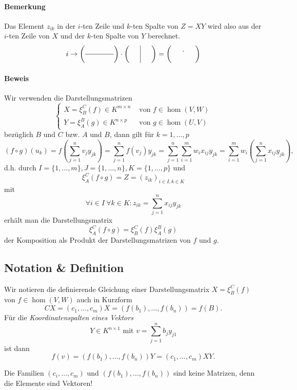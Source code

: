 \paragraph{Bemerkung}
	Das Element $ z_{ik} $ in der $ i $-ten Zeile und $ k $-ten Spalte von $ Z = XY $ wird also aus der $ i $-ten Zeile von $ X $ und der $k$-ten Spalte von $ Y $ berechnet.
	\begin{align*}
	    i\rightarrow
            \left(\begin{array}{cccc}
                &&&\\ 
                \hline
                &&&\\
            \end{array}\right)
            \cdot
            \left(\begin{array}{ccc}
                &\vline &\\
                &\vline &\\
            \end{array}\right)
            =
             \left(\begin{array}{ccc}
                & .&\\
                & &\\
            \end{array}\right)
	\end{align*}
\paragraph{Beweis}
	Wir verwenden die Darstellungsmatrizen
		\[ \begin{cases}
		X = \xi^C_B(f)\in K^{m\times n} &\text{ von } f\in \hom(V,W)\\
		Y = \xi_A^B(g)\in K^{n\times p} &\text{ von } g\in \hom(U,V)
		\end{cases} \]
	bezüglich $ B $ und $ C $ bzw. $ A $ und $ B $, dann gilt für $ k=1,\dots,p $
		\[ (f\circ g)(u_k)=f(\sum_{j=1}^{n}v_jy_{jk}) = \sum_{j=1}^{n}f(v_j)y_{jk} = \sum_{j=1}^{n}\sum_{i=1}^{m}w_ix_{ij}y_{jk} = \sum_{i=1}^{m}w_i\left(\sum_{j=1}^{n}x_{ij}y_{jk}\right), \]
	d.h. durch $ I=\{1,\dots,m\},J=\{1,\dots,n\},K=\{1,\dots,p\} $ und 
		\[ \xi_A^C(f\circ g) = Z = (z_{ik})_{i\in I,k\in K} \]
        mit
                \[ \forall i\in I\ \forall k\in K: z_{ik}= \sum_{j=1}^{n}x_{ij}y_{jk} \]
	erhält man die Darstellungsmatrix
		\[ \xi_A^C(f\circ g) = \xi_B^C(f)\xi_A^B(g) \]
	der Komposition als Produkt der Darstellungsmatrizen von $ f $ und $ g $.
\subsection{Notation \& Definition}
	\begin{Definition}
	Wir notieren die definierende Gleichung einer Darstellungsmatrix $ X=\xi_B^C(f) $ von $ f\in \hom(V,W) $ auch in Kurzform
		\[ CX=(c_1,\dots,c_m)X = (f(b_1),\dots,f(b_n)) = f(B). \]
	Für die \emph{Koordinatenspalten eines Vektors}
		\[ Y\in K^{n\times 1} \text{ mit } v=\sum_{j=1}^{n}b_jy_{j1} \]
	ist dann
		\[ f(v) = (f(b_1),\dots,f(b_n))Y = (c_1,\dots,c_m)XY. \]
	\end{Definition}
	Die Familien $ (c_i,\dots,c_m) $ und $ (f(b_1),\dots,f(b_n)) $ sind keine Matrizen, denn die Elemente sind Vektoren!
